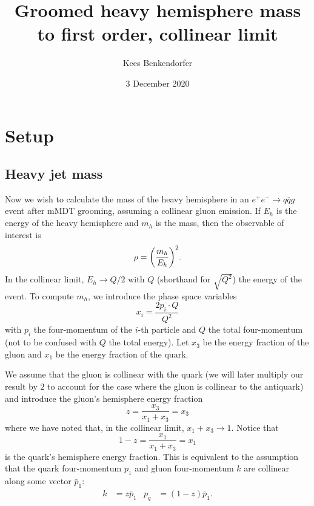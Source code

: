 \documentclass[11pt,twoside,reqno]{amsart}
\title{Groomed heavy hemisphere mass to first order, collinear limit}
\author{Kees Benkendorfer}
\date{3 December 2020}
\theoremstyle{plain}
\theoremstyle{remark}
\theoremstyle{definition}
\theoremstyle{remark}
\theoremstyle{definition}
\theoremstyle{definition}
\begin{document}
\maketitle

\tableofcontents

\section{Setup}

\subsection{Heavy jet mass}\label{sec: mass}

	Now we wish to calculate the mass of the heavy hemisphere in an $e^+ e^- \to q\bar q g$ event after mMDT grooming, assuming a collinear gluon emission. If $E_h$ is the energy of the heavy hemisphere and $m_h$ is the mass, then the observable of interest is \cite{larkoski_improving_2020}
	\begin{equation}
		\rho = \qty(\frac{m_h}{E_h})^2.
	\end{equation}
	In the collinear limit, $E_h \to Q/2$ with $Q$ (shorthand for $\sqrt{Q^2}$) the energy of the event. To compute $m_h$, we introduce the phase space variables
	\begin{equation}
		x_i = \frac{2 p_i \cdot Q}{Q^2}
	\end{equation}
	with $p_i$ the four-momentum of the $i$-th particle and $Q$ the total four-momentum (not to be confused with $Q$ the total energy). Let $x_3$ be the energy fraction of the gluon and $x_1$ be the energy fraction of the quark. 

	We assume that the gluon is collinear with the quark (we will later multiply our result by $2$ to account for the case where the gluon is collinear to the antiquark) and introduce the gluon's hemisphere energy fraction
	\begin{equation}
		z = \frac{x_3}{x_1 + x_3} = x_3
	\end{equation}
	where we have noted that, in the collinear limit, $x_1 + x_3 \to 1$. Notice that
	\begin{equation}
		1 - z = \frac{x_1}{x_1 + x_3} = x_1
	\end{equation}
	is the quark's hemisphere energy fraction. This is equivalent to the assumption that the quark four-momentum $p_1$ and gluon four-momentum $k$ are collinear along some vector $\bar p_1$:
	\begin{align}
		k &= z \bar p_1 & p_q &= (1 - z)\bar p_1.
	\end{align}
\end{document}
